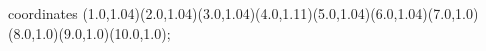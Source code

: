 					coordinates { (1.0,1.04)(2.0,1.04)(3.0,1.04)(4.0,1.11)(5.0,1.04)(6.0,1.04)(7.0,1.0)(8.0,1.0)(9.0,1.0)(10.0,1.0)};